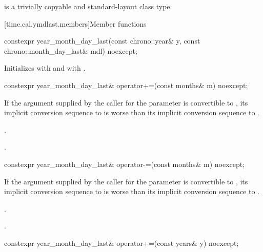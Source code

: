 \pnum
{} is a trivially copyable and standard-layout class type.

[time.cal.ymdlast.members]{Member functions}

%
\begin{itemdecl}
constexpr year_month_day_last(const chrono::year& y,
                              const chrono::month_day_last& mdl) noexcept;
\end{itemdecl}

\begin{itemdescr}
\pnum
\effects
Initializes  with  and  with .
\end{itemdescr}

%
\begin{itemdecl}
constexpr year_month_day_last& operator+=(const months& m) noexcept;
\end{itemdecl}

\begin{itemdescr}
\pnum
\constraints
If the argument supplied by the caller for the  parameter
is convertible to ,
its implicit conversion sequence to 
is worse than its implicit conversion sequence to
.

\pnum
\effects
{}.

\pnum
\returns
{}.
\end{itemdescr}

%
\begin{itemdecl}
constexpr year_month_day_last& operator-=(const months& m) noexcept;
\end{itemdecl}

\begin{itemdescr}
\pnum
\constraints
If the argument supplied by the caller for the  parameter
is convertible to ,
its implicit conversion sequence to 
is worse than its implicit conversion sequence to
.

\pnum
\effects
{}.

\pnum
\returns
{}.
\end{itemdescr}

%
\begin{itemdecl}
constexpr year_month_day_last& operator+=(const years& y) noexcept;
\end{itemdecl}

